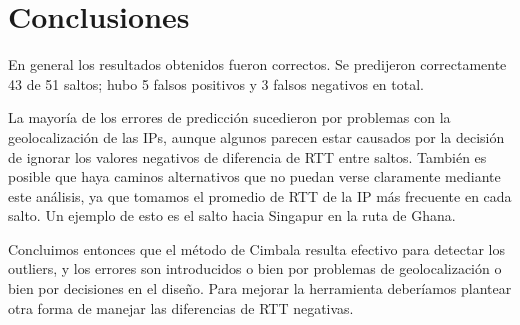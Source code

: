 \section{Conclusiones}

En general los resultados obtenidos fueron correctos. Se predijeron correctamente 43 de 51 saltos; hubo 5 falsos positivos y 3 falsos negativos en total. 

La mayoría de los errores de predicción sucedieron por problemas con la geolocalización de las IPs, aunque algunos parecen estar causados por la decisión de ignorar los valores negativos de diferencia de RTT entre saltos. También es posible que haya caminos alternativos que no puedan verse claramente mediante este análisis, ya que tomamos el promedio de RTT de la IP más frecuente en cada salto. Un ejemplo de esto es el salto hacia Singapur en la ruta de Ghana.

Concluimos entonces que el método de Cimbala resulta efectivo para detectar los outliers, y los errores son introducidos o bien por problemas de geolocalización o bien por decisiones en el diseño. Para mejorar la herramienta deberíamos plantear otra forma de manejar las diferencias de RTT negativas.

